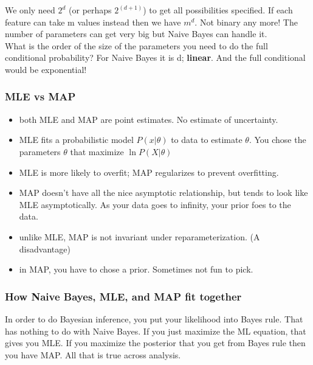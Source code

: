 		We only need $2^d$ (or perhaps $2^{(d+1)}$) to get all possibilities specified.  
            	If each feature can take m values instead then we have $m^d$.  Not binary any more!
		The number of parameters can get very big but Naive Bayes can handle it.  \hfill \\
		
		What is the order of the size of the parameters you need to do the full conditional probability?
		For Naive Bayes it is d; \textbf{linear}.  And the full conditional would be exponential! 
		
\subsubsection{MLE vs MAP}
\begin{itemize}
		\item both MLE and MAP are point estimates.  No estimate of uncertainty.  %
		\item MLE fits a probabilistic model $P(x | \theta)$ to data to estimate $\theta$. %
			You chose the parameters $\theta$ that maximize $\ln P(X | \theta)$
		\item MLE is more likely to overfit; MAP regularizes to prevent overfitting.  \hfill \\  %
		\item MAP doesn't have all the nice asymptotic relationship, but tends to look like MLE asymptotically.
			As your data goes to infinity, your prior foes to the data.  %
		\item unlike MLE, MAP is not invariant under reparameterization.  (A disadvantage)  %
		\item in MAP, you have to chose a prior.  Sometimes not fun to pick.  %
\end{itemize}

\subsubsection{How Naive Bayes, MLE, and MAP fit together}  %
In order to do Bayesian inference, you put your likelihood into Bayes rule.  That has nothing to do with Naive Bayes.
If you just maximize the ML equation, that gives you MLE.
If you maximize the posterior that you get from Bayes rule then you have MAP.  
All that is true across analysis.

